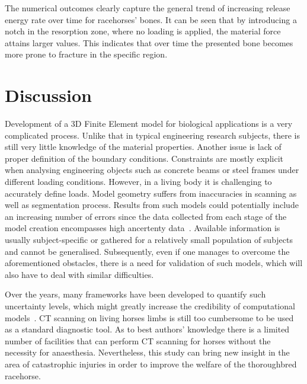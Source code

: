 \documentclass[11pt]{acmeArticle}
\numberwithin{equation}{section}
\begin{document}
The numerical outcomes clearly capture the general trend of increasing release energy rate over time for racehorses' bones. It can be seen that by introducing a notch in the resorption zone, where no loading is applied, the material force attains larger values. This indicates that over time the presented bone becomes more prone to fracture in the specific region. 



\section{Discussion}\label{sec:discussion}
Development of a 3D Finite Element model for biological applications is a very complicated process. 
Unlike that in typical engineering research subjects, there is still very little knowledge of the material properties. 
Another issue is lack of proper definition of the boundary conditions. Constraints are mostly explicit when analysing engineering objects such as concrete beams or steel frames under different loading conditions. 
However, in a living body it is challenging to accurately define loads. 
Model geometry suffers from inaccuracies in scanning as well as segmentation process. 
Results from such models could potentially include an increasing number of errors since the data collected from each stage of the 
model creation encompasses high ancertenty data~\citep{campoli2014effects}.
Available information is usually subject-specific or gathered for a relatively small population of subjects and cannot be generalised. 
Subsequently, even if one manages to overcome the aforementioned obstacles, there is a need for validation of such models, which will also have to deal with similar difficulties. 

Over the years, many frameworks have been developed to quantify such uncertainty levels, which might greatly increase the credibility of computational models~\citep{wille2016uncertainty}. 
CT scanning on living horses limbs is still too cumbersome to be used as a standard diagnostic tool.
As to best authors' knowledge there is a limited number of facilities that can perform CT scanning for horses without the necessity for anaesthesia. 
Nevertheless, this study can bring new insight in the area of catastrophic injuries in order to improve the welfare of the thoroughbred racehorse. %
\end{document}
